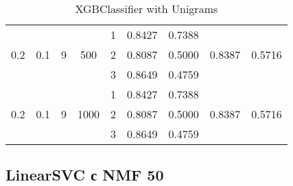 \documentclass[12pt, twoside]{article}
\begin{document}
\begin{landscape}
\begin{table}[!htbp]
\begin{tabular}{ccccccccc}
  	\cmidrule(r){5-9}
  	&	&	&	&	1	&	0.8427	&	0.7388	&		&	 \\
  0.2	&	0.1	&	9	&	500	&	2	&	0.8087	&	0.5000	&	0.8387	&	0.5716 \\
  	&	&	&	&	3	&	0.8649	&	0.4759	&		&	 \\
  	\cmidrule(r){5-9}
  	&	&	&	&	1	&	0.8427	&	0.7388	&		&	 \\
  0.2	&	0.1	&	9	&	1000	&	2	&	0.8087	&	0.5000	&	0.8387	&	0.5716 \\
  	&	&	&	&	3	&	0.8649	&	0.4759	&		&	 \\
  \bottomrule
  \end{tabular}
  \caption{XGBClassifier with Unigrams}
\end{table}
\end{landscape}

\subsection{LinearSVC с NMF 50}
\end{document}
